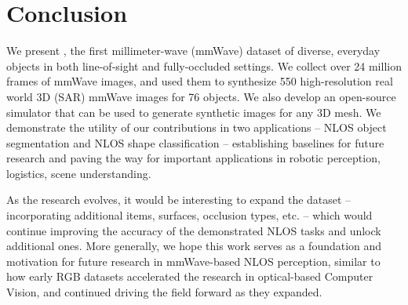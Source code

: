 
\vspace{-0.05in}
\section{Conclusion}
\vspace{-0.05in}


We present \name, the first millimeter-wave (mmWave) dataset of diverse, everyday objects in both line-of-sight and fully-occluded settings. We collect over 24 million frames of mmWave images, and used them to synthesize 550 high-resolution real world 3D (SAR) mmWave images for 76 objects. We also develop an open-source simulator that can be used to generate synthetic images for any 3D mesh. We demonstrate the utility of our contributions in two applications -- NLOS object segmentation and NLOS shape classification -- establishing baselines for future research and paving the way for important applications in robotic perception, logistics, scene understanding.

As the research evolves, it would be interesting to expand the dataset -- incorporating additional items, surfaces, occlusion types, etc. -- which would continue improving the accuracy of the demonstrated NLOS tasks and unlock additional ones. More generally, we hope this work serves as a foundation and motivation for future research in mmWave-based NLOS perception, similar to how early RGB datasets accelerated the research in optical-based Computer Vision, and continued driving the field forward as they expanded.



